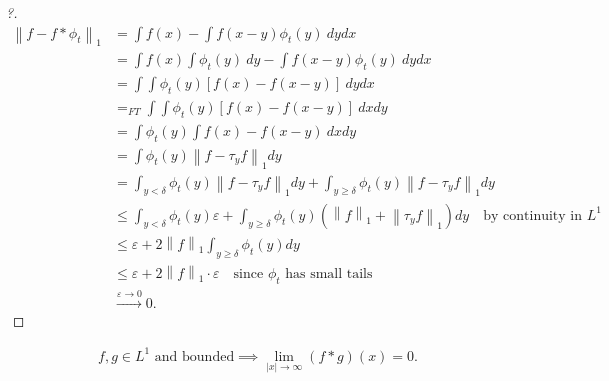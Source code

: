 \begin{proof}[?]

\begin{align*}
{\left\lVert {f - f\ast \phi_{t}} \right\rVert}_1 
&= \int f(x) - \int f(x-y)\phi_{t}(y) ~dy dx \\
&= \int f(x)\int \phi_{t}(y) ~dy - \int f(x-y)\phi_{t}(y) ~dy dx \\
&= \int \int \phi_{t}(y)[f(x) - f(x-y)] ~dy dx \\
&=_{FT} \int \int \phi_{t}(y)[f(x) - f(x-y)] ~dx dy \\
&= \int \phi_{t}(y) \int f(x) - f(x-y) ~dx dy \\
&= \int \phi_{t}(y) {\left\lVert {f - \tau_{y} f} \right\rVert}_1 dy \\
&= \int_{y < \delta} \phi_{t}(y) {\left\lVert {f - \tau_{y} f} \right\rVert}_1 dy  +
\int_{y \geq \delta} \phi_{t}(y) {\left\lVert {f - \tau_{y} f} \right\rVert}_1 dy \\
&\leq \int_{y < \delta} \phi_{t}(y) \varepsilon +
\int_{y \geq \delta} \phi_{t}(y) \left( {\left\lVert {f} \right\rVert}_1 + {\left\lVert {\tau_{y} f} \right\rVert}_1 \right) dy \quad\text{by continuity in } L^1 \\
&\leq \varepsilon + 
2{\left\lVert {f} \right\rVert}_1 \int_{y \geq \delta} \phi_{t}(y) dy \\
&\leq \varepsilon + 2{\left\lVert {f} \right\rVert}_1 \cdot \varepsilon \quad\text{since $\phi_{t}$ has small tails} \\
&\overset{{\varepsilon}\to 0}\to 0 
.\end{align*}

\end{proof}

\begin{theorem}

\begin{align*}
f,g \in L^1 \text{ and  bounded}  \implies \lim_{|x| \rightarrow \infty} (f * g)(x) = 0
.\end{align*}

\end{theorem}

